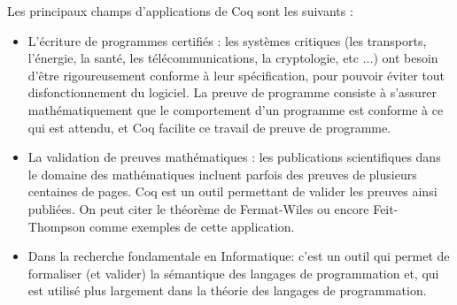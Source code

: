\documentclass[a4paper, 11pt]{report}
\begin{document}
      Les principaux champs d'applications de Coq sont les suivants :
      \begin{itemize}
        \item L'écriture de programmes certifiés : les systèmes critiques
          (les transports, l'énergie, la santé, les télécommunications, la
          cryptologie, etc $\ldots$) ont besoin d'être rigoureusement conforme
          à leur spécification, pour pouvoir éviter tout disfonctionnement
          du logiciel. La preuve de programme consiste à s'assurer
          mathématiquement que le comportement d'un programme est conforme à
          ce qui est attendu, et Coq facilite ce travail de preuve de programme.
      \item La validation de preuves mathématiques : les publications
          scientifiques dans le domaine des mathématiques incluent parfois
          des preuves de plusieurs centaines de pages. Coq est un outil
          permettant de valider les preuves ainsi publiées. On peut citer
          le théorème de Fermat-Wiles ou encore Feit-Thompson comme exemples
          de cette application.
        \item Dans la recherche fondamentale en Informatique: c'est un outil
          qui permet de formaliser (et valider) la sémantique des langages de
          programmation et, qui est utilisé plus largement dans la théorie
          des langages de programmation.
      \end{itemize}
\end{document}

